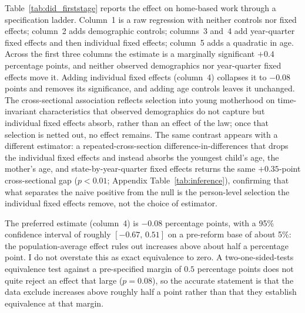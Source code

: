 \documentclass[12pt]{article}
\begin{document}
Table~\ref{tab:did_firststage} reports the effect on home-based work through a specification ladder. Column~1 is a raw regression with neither controls nor fixed effects; column~2 adds demographic controls; columns~3 and~4 add year-quarter fixed effects and then individual fixed effects; column~5 adds a quadratic in age. Across the first three columns the estimate is a marginally significant $+0.4$ percentage points, and neither observed demographics nor year-quarter fixed effects move it. Adding individual fixed effects (column~4) collapses it to $-0.08$ points and removes its significance, and adding age controls leaves it unchanged. The cross-sectional association reflects selection into young motherhood on time-invariant characteristics that observed demographics do not capture but individual fixed effects absorb, rather than an effect of the law; once that selection is netted out, no effect remains. The same contrast appears with a different estimator: a repeated-cross-section difference-in-differences that drops the individual fixed effects and instead absorbs the youngest child's age, the mother's age, and state-by-year-quarter fixed effects returns the same $+0.35$-point cross-sectional gap ($p<0.01$; Appendix Table~\ref{tab:inference}), confirming that what separates the naive positive from the null is the person-level selection the individual fixed effects remove, not the choice of estimator.



The preferred estimate (column~4) is $-0.08$ percentage points, with a 95\% confidence interval of roughly $[-0.67,\,0.51]$ on a pre-reform base of about 5\%: the population-average effect rules out increases above about half a percentage point. I do not overstate this as exact equivalence to zero. A two-one-sided-tests equivalence test against a pre-specified margin of $0.5$ percentage points does not quite reject an effect that large ($p=0.08$), so the accurate statement is that the data exclude increases above roughly half a point rather than that they establish equivalence at that margin.
\end{document}
